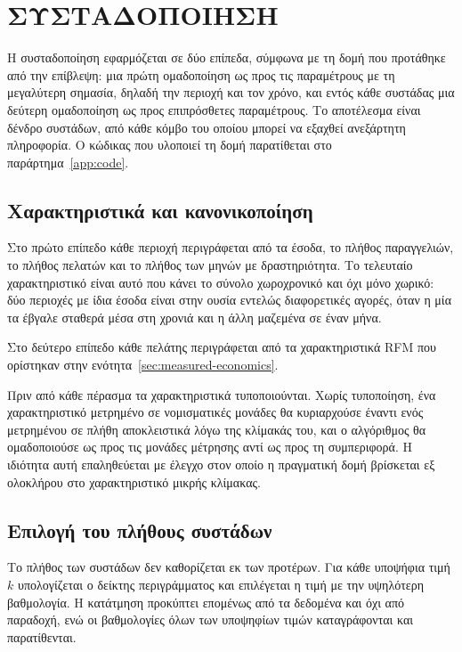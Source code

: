 \chapter{ΣΥΣΤΑΔΟΠΟΙΗΣΗ}
\label{chap:clustering}

Η συσταδοποίηση εφαρμόζεται σε δύο επίπεδα, σύμφωνα με τη δομή που προτάθηκε
από την επίβλεψη: μια πρώτη ομαδοποίηση ως προς τις παραμέτρους με τη
μεγαλύτερη σημασία, δηλαδή την περιοχή και τον χρόνο, και εντός κάθε συστάδας
μια δεύτερη ομαδοποίηση ως προς επιπρόσθετες παραμέτρους. Το αποτέλεσμα είναι
δένδρο συστάδων, από κάθε κόμβο του οποίου μπορεί να εξαχθεί ανεξάρτητη
πληροφορία. Ο κώδικας που υλοποιεί τη δομή παρατίθεται στο
παράρτημα~\ref{app:code}.

\section{Χαρακτηριστικά και κανονικοποίηση}

Στο πρώτο επίπεδο κάθε περιοχή περιγράφεται από τα έσοδα, το πλήθος
παραγγελιών, το πλήθος πελατών και το πλήθος των μηνών με δραστηριότητα. Το
τελευταίο χαρακτηριστικό είναι αυτό που κάνει το σύνολο χωροχρονικό και όχι
μόνο χωρικό: δύο περιοχές με ίδια έσοδα είναι στην ουσία εντελώς διαφορετικές
αγορές, όταν η μία τα έβγαλε σταθερά μέσα στη χρονιά και η άλλη μαζεμένα σε
έναν μήνα.

Στο δεύτερο επίπεδο κάθε πελάτης περιγράφεται από τα χαρακτηριστικά RFM που
ορίστηκαν στην ενότητα~\ref{sec:measured-economics}.

Πριν από κάθε πέρασμα τα χαρακτηριστικά τυποποιούνται. Χωρίς τυποποίηση, ένα
χαρακτηριστικό μετρημένο σε νομισματικές μονάδες θα κυριαρχούσε έναντι ενός
μετρημένου σε πλήθη αποκλειστικά λόγω της κλίμακάς του, και ο αλγόριθμος θα
ομαδοποιούσε ως προς τις μονάδες μέτρησης αντί ως προς τη συμπεριφορά. Η
ιδιότητα αυτή επαληθεύεται με έλεγχο στον οποίο η πραγματική δομή βρίσκεται
εξ ολοκλήρου στο χαρακτηριστικό μικρής κλίμακας.

\section{Επιλογή του πλήθους συστάδων}

Το πλήθος των συστάδων δεν καθορίζεται εκ των προτέρων. Για κάθε υποψήφια τιμή
$k$ υπολογίζεται ο δείκτης περιγράμματος \cite{rousseeuw1987silhouettes}
και επιλέγεται η τιμή με την υψηλότερη βαθμολογία. Η κατάτμηση προκύπτει
επομένως από τα δεδομένα και όχι από παραδοχή, ενώ οι βαθμολογίες όλων των
υποψηφίων τιμών καταγράφονται και παρατίθενται.

